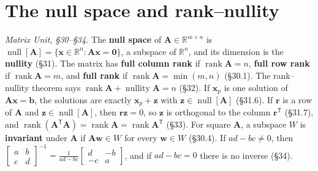 \documentclass[11pt]{article}
\newcommand{\R}{\mathbb{R}}
\newcommand{\vc}[1]{\mathbf{#1}}
\newcommand{\mt}[1]{\mathbf{#1}}          %
\newcommand{\T}{^{\mathsf{T}}}            %
\newcommand{\nullsp}[1]{\operatorname{null}[#1]}
\DeclareMathOperator{\rank}{rank}
\DeclareMathOperator{\nullity}{nullity}
\begin{document}
\section{The null space and rank--nullity}
\emph{Matrix Unit, \S30--\S34.} The \textbf{null space} of
$\mt{A}\in\R^{m\times n}$ is $\nullsp{\mt{A}}=\{\vc{x}\in\R^{n}:\mt{A}\vc{x}=\vc{0}\}$,
a subspace of $\R^{n}$, and its dimension is the \textbf{nullity} (\S31). The
matrix has \textbf{full column rank} if $\rank\mt{A}=n$, \textbf{full row rank}
if $\rank\mt{A}=m$, and \textbf{full rank} if $\rank\mt{A}=\min(m,n)$ (\S30.1).
The rank--nullity theorem says $\rank\mt{A}+\nullity\mt{A}=n$ (\S32). If
$\vc{x}_p$ is one solution of $\mt{A}\vc{x}=\vc{b}$, the solutions are exactly
$\vc{x}_p+\vc{z}$ with $\vc{z}\in\nullsp{\mt{A}}$ (\S31.6). If $\vc{r}$ is a
row of $\mt{A}$ and $\vc{z}\in\nullsp{\mt{A}}$, then $\vc{r}\vc{z}=0$, so
$\vc{z}$ is orthogonal to the column $\vc{r}\T$ (\S31.7), and
$\rank(\mt{A}\T\mt{A})=\rank\mt{A}=\rank\mt{A}\T$ (\S33). For square
$\mt{A}$, a subspace $W$ is \textbf{invariant} under $\mt{A}$ if
$\mt{A}\vc{w}\in W$ for every $\vc{w}\in W$ (\S30.4). If $ad-bc\neq0$, then
$\left[\begin{smallmatrix}a&b\\c&d\end{smallmatrix}\right]^{-1}
=\frac{1}{ad-bc}\left[\begin{smallmatrix}d&-b\\-c&a\end{smallmatrix}\right]$,
and if $ad-bc=0$ there is no inverse (\S34).
\end{document}
